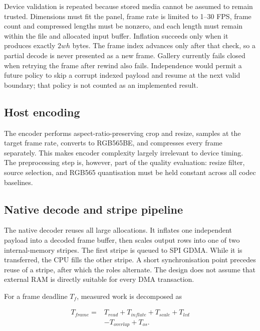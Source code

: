 \documentclass[11pt,twocolumn]{article}
\begin{document}
Device validation is repeated because stored media cannot be assumed to remain
trusted.  Dimensions must fit the panel, frame rate is limited to 1--30 FPS,
frame count and compressed lengths must be nonzero, and each length must remain
within the file and allocated input buffer.  Inflation succeeds only when it
produces exactly $2wh$ bytes.  The frame index advances only after that check,
so a partial decode is never presented as a new frame.  Gallery currently
fails closed when retrying the frame after rewind also fails.  Independence
would permit a future policy to skip a corrupt indexed payload and resume at
the next valid boundary; that policy is not counted as an implemented result.

\subsection{Host encoding}

The encoder performs aspect-ratio-preserving crop and resize, samples at the
target frame rate, converts to RGB565BE, and compresses every frame separately.
This makes encoder complexity largely irrelevant to device timing.  The
preprocessing step is, however, part of the quality evaluation: resize filter,
source selection, and RGB565 quantisation must be held constant across all
codec baselines.

\subsection{Native decode and stripe pipeline}

The native decoder reuses all large allocations.  It inflates one independent
payload into a decoded frame buffer, then scales output rows into one of two
internal-memory stripes.  The first stripe is queued to SPI GDMA.  While it is
transferred, the CPU fills the other stripe.  A short synchronisation point
precedes reuse of a stripe, after which the roles alternate.  The design does
not assume that external RAM is directly suitable for every DMA transaction.

For a frame deadline $T_f$, measured work is decomposed as

\begin{equation}
\begin{aligned}
T_{frame}={}&T_{read}+T_{inflate}+T_{scale}+T_{lcd}\\
             &-T_{overlap}+T_{os}.
\end{aligned}
\end{equation}
\end{document}

